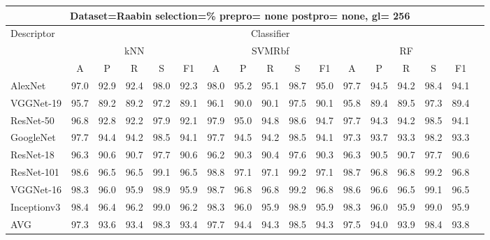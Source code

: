 \documentclass[12pt,italian]{article}
\begin{document}
\begin{tiny}
\begin{longtable}{lcccccccccccccccc}
\toprule
\multicolumn{16}{c}{Dataset=Raabin selection=\% prepro= none postpro= none, gl= 256} \\ 
\toprule
Descriptor & \multicolumn{15}{c}{Classifier} \\ 
& \multicolumn{5}{c}{kNN} & \multicolumn{5}{c}{SVMRbf} & \multicolumn{5}{c}{RF} \\ 
& A & P & R & S & F1 & A & P & R & S & F1 & A & P & R & S & F1 \\ 
\midrule
AlexNet & 97.0 & 92.9 & 92.4 & 98.0 & 92.3 & 98.0 & 95.2 & 95.1 & 98.7 & 95.0 & 97.7 & 94.5 & 94.2 & 98.4 & 94.1 \\ 
VGGNet-19 & 95.7 & 89.2 & 89.2 & 97.2 & 89.1 & 96.1 & 90.0 & 90.1 & 97.5 & 90.1 & 95.8 & 89.4 & 89.5 & 97.3 & 89.4 \\ 
ResNet-50 & 96.8 & 92.8 & 92.2 & 97.9 & 92.1 & 97.9 & 95.0 & 94.8 & 98.6 & 94.7 & 97.7 & 94.3 & 94.2 & 98.5 & 94.1 \\ 
GoogleNet & 97.7 & 94.4 & 94.2 & 98.5 & 94.1 & 97.7 & 94.5 & 94.2 & 98.5 & 94.1 & 97.3 & 93.7 & 93.3 & 98.2 & 93.3 \\ 
ResNet-18 & 96.3 & 90.6 & 90.7 & 97.7 & 90.6 & 96.2 & 90.3 & 90.4 & 97.6 & 90.3 & 96.3 & 90.5 & 90.7 & 97.7 & 90.6 \\ 
ResNet-101 & 98.6 & 96.5 & 96.5 & 99.1 & 96.5 & 98.8 & 97.1 & 97.1 & 99.2 & 97.1 & 98.7 & 96.8 & 96.8 & 99.2 & 96.8 \\ 
VGGNet-16 & 98.3 & 96.0 & 95.9 & 98.9 & 95.9 & 98.7 & 96.8 & 96.8 & 99.2 & 96.8 & 98.6 & 96.6 & 96.5 & 99.1 & 96.5 \\ 
Inceptionv3 & 98.4 & 96.4 & 96.2 & 99.0 & 96.2 & 98.3 & 96.0 & 95.9 & 98.9 & 95.9 & 98.3 & 96.0 & 95.9 & 99.0 & 95.9 \\ 
\hline
AVG & 97.3 & 93.6 & 93.4 & 98.3 & 93.4 & 97.7 & 94.4 & 94.3 & 98.5 & 94.3 & 97.5 & 94.0 & 93.9 & 98.4 & 93.8 \\ 
\hline
\bottomrule
\end{longtable} 

 \pagebreak 
\end{tiny} 
 
\end{document}
